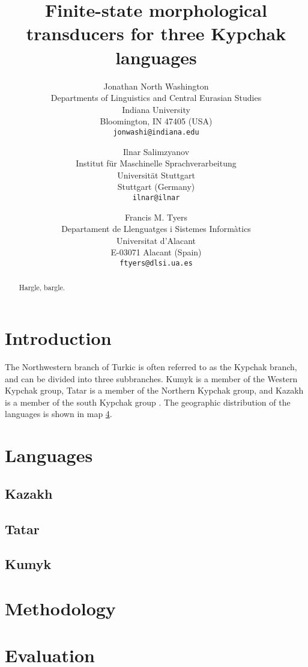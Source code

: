 \documentclass{article}
\title{Finite-state morphological transducers for three Kypchak languages}
\author{Jonathan North Washington \\
Departments of Linguistics and Central Eurasian Studies\\
Indiana University\\
Bloomington, IN 47405 (USA)\\
\texttt{jonwashi@indiana.edu} \and
Ilnar Salimzyanov  \\
Institut für Maschinelle Sprachverarbeitung \\
Universität Stuttgart\\
Stuttgart (Germany) \\
\texttt{ilnar@ilnar} \and 
Francis M. Tyers\\
Departament de Llenguatges i Sistemes Informàtics \\  
Universitat d'Alacant\\
E-03071 Alacant (Spain)\\
\texttt{ftyers@dlsi.ua.es} 
}
\begin{document}
\maketitle

\begin{abstract}
Hargle, bargle.
\end{abstract}

\section{Introduction}

The Northwestern branch of Turkic is often referred to as the Kypchak branch, and can be divided into three subbranches.  Kumyk is a member of the Western Kypchak group, Tatar is a member of the Northern Kypchak group, and Kazakh is a member of the south Kypchak group \citep[82-83]{histofturkic}.  The geographic distribution of the languages is shown in map \ref{}.

\cite{washington2012}
\cite{salimzyanov2013}
\cite{bekmanova2013}

\section{Languages}

\subsection{Kazakh}

\subsection{Tatar}

\subsection{Kumyk}

\cite{bammatov1960}

\section{Methodology}

\section{Evaluation}
\end{document}
